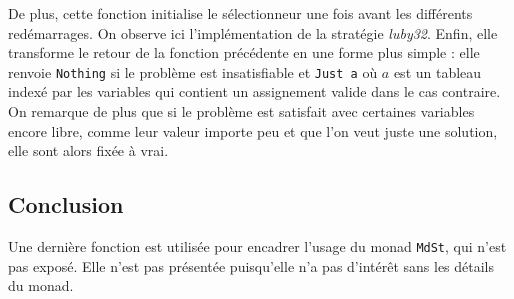 De plus, cette fonction initialise le sélectionneur une fois avant les
différents redémarrages. On observe ici l'implémentation de la stratégie
\emph{luby32}. Enfin, elle transforme le retour de la fonction précédente
en une forme plus simple : elle renvoie \texttt{Nothing} si le problème
est insatisfiable et \texttt{Just a} où $a$ est un tableau indexé par les
variables qui contient un assignement valide dans le cas contraire. On remarque
de plus que si le problème est satisfait avec certaines variables encore libre,
comme leur valeur importe peu et que l'on veut juste une solution, elle sont
alors fixée à vrai.

\subsection{Conclusion}
Une dernière fonction est utilisée pour encadrer l'usage du monad
\texttt{MdSt}, qui n'est pas exposé. Elle n'est pas présentée puisqu'elle n'a
pas d'intérêt sans les détails du monad.

